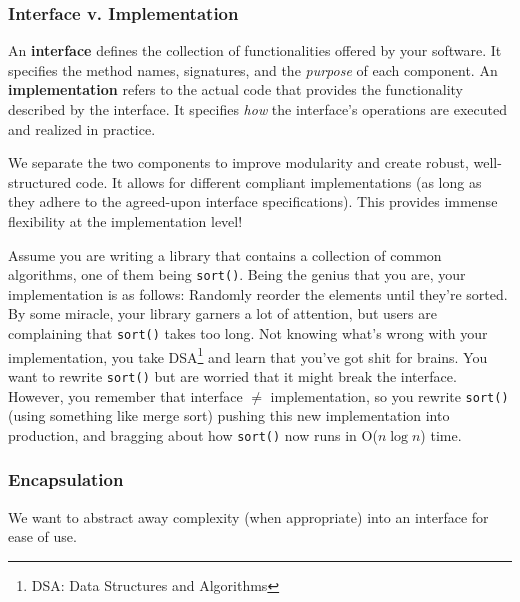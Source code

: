 \documentclass{article}
\begin{document}
\subsubsection*{Interface v. Implementation}
\begin{tcolorbox}[title=Definition: Interface and Implementation]
  An \textbf{interface} defines the collection of functionalities offered by your software. It
  specifies the method names, signatures, and the \textit{purpose} of each component. 
  \tcblower
  An \textbf{implementation} refers to the actual code that provides the functionality described by
  the interface. It specifies \textit{how} the interface's operations are executed and realized in practice. 
\end{tcolorbox}
We separate the two components to improve modularity and create robust, well-structured code. It
allows for different compliant implementations (as long as they adhere to the agreed-upon interface
specifications). This provides immense flexibility at the implementation level!

\begin{tcolorbox}[colback=blue!5!white,colframe=black!75!blue,title=Example: Sort Swapping]
  Assume you are writing a library that contains a collection of common algorithms, one of them
  being \texttt{sort()}. Being the genius that you are, your implementation is as follows: Randomly
  reorder the elements until they're sorted. By some miracle, your library garners a lot of
  attention, but users are complaining that \texttt{sort()} takes too long. Not knowing what's wrong
  with your implementation, you take DSA\footnote[1]{DSA: Data Structures and Algorithms} 
  and learn that you've got shit for brains. You want to rewrite \texttt{sort()} but are worried
  that it might break the interface. However, you remember that interface $\neq$ implementation, so
  you rewrite \texttt{sort()} (using something like merge sort) pushing this new implementation
  into production, and bragging about how \texttt{sort()} now runs in O($n \log n$) time. 
\end{tcolorbox}

\subsubsection*{Encapsulation}
We want to abstract away complexity (when appropriate) into an interface for ease of use.
\end{document}
